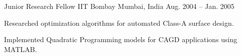 \begin{cventries}
\cventry
  {Junior Research Fellow}
  {IIT Bombay}
  {Mumbai, India}
  {Aug. 2004 – Jan. 2005}
  {
    \begin{cvitems}
      \item {Researched optimization algorithms for automated Class-A surface design.}
      \item {Implemented Quadratic Programming models for CAGD applications using MATLAB.}
    \end{cvitems}
  }

\end{cventries}

